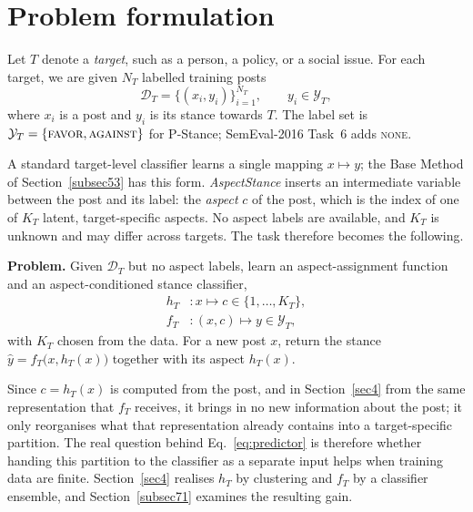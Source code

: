 \documentclass[pdflatex,sn-mathphys-num,iicol]{sn-jnl}%
\begin{document}
\section{Problem formulation}\label{sec3}

Let \(T\) denote a \emph{target}, such as a person, a policy, or a social issue. For each target, we are given \(N_T\) labelled training posts
\begin{equation}\label{eq:data}
\mathcal{D}_T = \{(x_i, y_i)\}_{i=1}^{N_T}, \qquad y_i \in \mathcal{Y}_T,
\end{equation}
where \(x_i\) is a post and \(y_i\) is its stance towards \(T\). The label set is \(\mathcal{Y}_T = \{\textsc{favor}, \textsc{against}\}\) for P-Stance; SemEval-2016 Task~6 adds \textsc{none}.

A standard target-level classifier learns a single mapping \(x \mapsto y\); the Base Method of Section~\ref{subsec53} has this form. \textit{AspectStance} inserts an intermediate variable between the post and its label: the \emph{aspect} \(c\) of the post, which is the index of one of \(K_T\) latent, target-specific aspects. No aspect labels are available, and \(K_T\) is unknown and may differ across targets. The task therefore becomes the following.

\begin{tcolorbox}[colframe=snrule, colback=snbox, boxrule=0.6pt, arc=3pt, width=\linewidth, left=6pt, right=6pt, top=4pt, bottom=5pt, before skip=8pt, after skip=8pt]
\textbf{Problem.} Given \(\mathcal{D}_T\) but no aspect labels, learn an aspect-assignment function and an aspect-conditioned stance classifier,
\begin{align}
h_T &: x \mapsto c \in \{1, \dots, K_T\}, \label{eq:aspects}\\
f_T &: (x, c) \mapsto y \in \mathcal{Y}_T, \label{eq:predictor}
\end{align}
with \(K_T\) chosen from the data. For a new post \(x\), return the stance \(\hat{y} = f_T\bigl(x, h_T(x)\bigr)\) together with its aspect \(h_T(x)\).
\end{tcolorbox}

Since \(c = h_T(x)\) is computed from the post, and in Section~\ref{sec4} from the same representation that \(f_T\) receives, it brings in no new information about the post; it only reorganises what that representation already contains into a target-specific partition. The real question behind Eq.~\eqref{eq:predictor} is therefore whether handing this partition to the classifier as a separate input helps when training data are finite. Section~\ref{sec4} realises \(h_T\) by clustering and \(f_T\) by a classifier ensemble, and Section~\ref{subsec71} examines the resulting gain.
\end{document}

